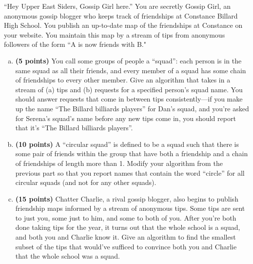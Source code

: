 \documentclass[11pt,letterpaper]{article}
\begin{document}
\pagebreak
\begin{problem}
    ``Hey Upper East Siders, Gossip Girl here.'' You are secretly Gossip Girl, an anonymous gossip blogger who keeps track of friendships at Constance Billard High School. You publish an up-to-date map of the friendships at Constance on your website. You maintain this map by a stream of tips from anonymous followers of the form ``A is now friends with B." 

    \begin{enumerate}[(a)]
        \item {\bf (5 points)} You call some groups of people a ``squad'': each person is in the same squad as all their friends, and every member of a squad has some chain of friendships to every other member. Give an algorithm that takes in a stream of (a) tips and (b) requests for a specified person's squad name. You should answer requests that come in between tips consistently---if you make up the name ``The Billard billiards players'' for Dan's squad, and you're asked for Serena's squad's name before any new tips come in, you should report that it's ``The Billard billiards players''.
        \item {\bf (10 points)} A ``circular squad'' is defined to be a squad such that there is some pair of friends within the group that have both a friendship and a chain of friendships of length more than 1. Modify your algorithm from the previous part so that you report names that contain the word ``circle'' for all circular squads (and not for any other squads).
        \item {\bf (15 points)} Chatter Charlie, a rival gossip blogger, also begins to publish friendship maps informed by a stream of anonymous tips. Some tips are sent to just you, some just to him, and some to both of you. After you're both done taking tips for the year, it turns out that the whole school is a squad, and both you and Charlie know it. Give an algorithm to find the smallest subset of the tips that would've sufficed to convince both you and Charlie that the whole school was a squad.
    \end{enumerate}
\end{problem}
\end{document}
